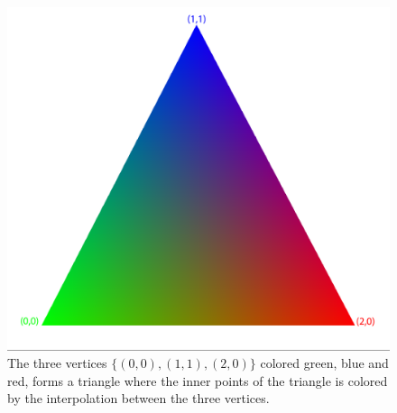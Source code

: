 \begin{figure}[h]
\begin{center}
\includegraphics[width=\textwidth, trim=0cm 0cm 0cm 0cm, clip]{opengl/figures/color_interpolation.png}
\end{center}
\caption{The three vertices $\{(0,0), (1,1), (2,0)\}$ colored green, blue and red, forms a triangle where the inner points of the triangle is colored by the interpolation between the three vertices.}
\label{fig:opengl_color_interpolation}
\end{figure}
